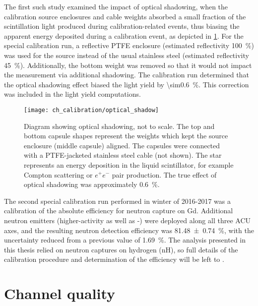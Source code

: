 The first such study examined the impact of optical shadowing,
when the calibration source enclosures and cable weights
absorbed a small fraction of the scintillation light
produced during calibration-related events,
thus biasing the apparent energy deposited during a calibration event,
as depicted in \cref{fig:optical_shadowing}.
For the special calibration run,
a reflective PTFE enclosure (estimated reflectivity \SI{100}{\percent})
was used for the  source
instead of the usual stainless steel (estimated reflectivity \SI{45}{\percent}).
Additionally, the bottom weight was removed
so that it would not impact the measurement via additional shadowing.
The calibration run determined that
the optical shadowing effect biased the light yield by \SI{\sim0.6}{\percent}.
This correction was included in the light yield computations.

\begin{figure}
    \centering
    \texttt{[image: ch\_calibration/optical\_shadow]}
    \caption[Optical shadowing diagram]{
        Diagram showing optical shadowing, not to scale.
        The top and bottom capsule shapes represent the weights
        which kept the source enclosure (middle capsule) aligned.
        The capsules were connected with a PTFE-jacketed stainless steel cable (not shown).
        The star represents an energy deposition in the liquid scintillator,
        for example Compton scattering or $e^+e^-$ pair production.
        The true effect of optical shadowing was approximately \SI{0.6}{\percent}.
    }
    \label{fig:optical_shadowing}
\end{figure}

The second special calibration run performed in winter of 2016-2017
was a calibration of the absolute efficiency for neutron capture on Gd.
Additional neutron emitters
(higher-activity \amc{} as well as -)
were deployed along all three ACU axes,
and the resulting neutron detection efficiency
was \SI{81.48\pm0.74}{\percent},
with the uncertainty reduced from a previous value of \SI{1.69}{\percent}.
The analysis presented in this thesis
relied on neutron captures on hydrogen (nH),
so full details of the calibration procedure and determination of the efficiency
will be left to \cite{reactor_flux2019}.

\section{Channel quality}
\label{sec:channel_quality}

